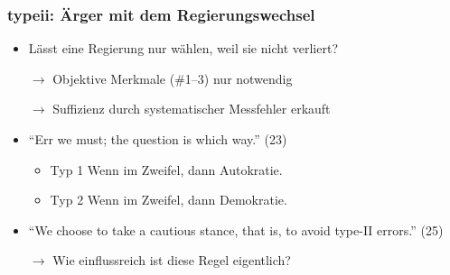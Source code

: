 \documentclass{beamer}
\begin{document}
\begin{frame}
  \frametitle{{\sc typeii}: Ärger mit dem Regierungswechsel}
  \begin{itemize}
    \item Lässt eine Regierung nur wählen, weil sie nicht verliert?
    \item[$\rightarrow$] Objektive Merkmale (\#1--3) nur notwendig
    \item[$\rightarrow$] Suffizienz durch systematischer Messfehler erkauft
    \item ``Err we must; the question is which way.'' (23)
    \begin{itemize}
      \item Typ 1 Wenn im Zweifel, dann Autokratie.
      \item Typ 2 Wenn im Zweifel, dann Demokratie.
    \end{itemize}
    \item ``We choose to take a cautious stance, that is, to avoid type-II errors.'' (25)
    \item [$\rightarrow$] Wie einflussreich ist diese Regel eigentlich?
  \end{itemize}
\end{frame}
\end{document}
